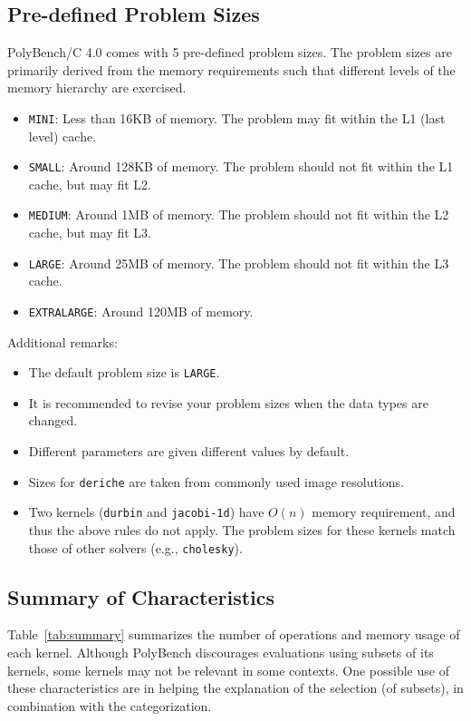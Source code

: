 \documentclass{article}
\begin{document}
\subsection*{Pre-defined Problem Sizes}
PolyBench/C 4.0 comes with 5 pre-defined problem sizes. The problem sizes are
primarily derived from the memory requirements such that different levels of
the memory hierarchy are exercised.

\begin{itemize}
\item {\tt MINI}: Less than 16KB of memory. The problem may fit within the L1 (last level) cache.
\item {\tt SMALL}: Around 128KB of memory. The problem should not fit within the L1 cache, but may fit L2.
\item {\tt MEDIUM}: Around 1MB of memory. The problem should not fit within the L2 cache, but may fit L3.
\item {\tt LARGE}: Around 25MB of memory. The problem should not fit within the L3 cache.
\item {\tt EXTRALARGE}: Around 120MB of memory. 
\end{itemize}

Additional remarks:
\begin{itemize}
\item The default problem size is {\tt LARGE}.
\item It is  recommended to revise your problem sizes when the data types are changed.
\item Different parameters are given different values by default.
\item Sizes for {\tt deriche} are taken from commonly used image resolutions.
\item Two kernels ({\tt durbin} and {\tt jacobi-1d}) have $O(n)$ memory requirement, and thus the above rules do not apply.
The problem sizes for these kernels match those of other solvers (e.g., {\tt cholesky}).
\end{itemize}

\subsection*{Summary of Characteristics}
Table~\ref{tab:summary} summarizes the number of operations and memory usage of
each kernel. Although PolyBench discourages evaluations using subsets of its
kernels, some kernels may not be relevant in some contexts. One possible use of
these characteristics are in helping the explanation of the selection (of
subsets), in combination with the categorization.
\end{document}
